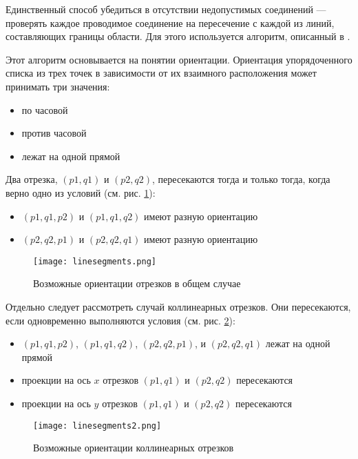 Единственный способ убедиться в отсутствии недопустимых соединений --- проверять каждое проводимое соединение на пересечение с каждой из линий, составляющих границы области. Для этого используется алгоритм, описанный в \cite{noauthor_introduction_2009}.

Этот алгоритм основывается на понятии ориентации. Ориентация упорядоченного списка из трех точек в зависимости от их взаимного расположения может принимать три значения:

\begin{itemize}[noitemsep]
\item по часовой
\item против часовой
\item лежат на одной прямой
\end{itemize}

Два отрезка, $(p1,q1)$ и $(p2,q2)$, пересекаются тогда и только тогда, когда верно одно из условий (см. рис. \ref{fig:segments1}):

\begin{itemize}[noitemsep]
\item $(p1, q1, p2)$ и $(p1, q1, q2)$ имеют разную ориентацию
\item $(p2, q2, p1)$ и $(p2, q2, q1)$ имеют разную ориентацию
\end{itemize}

\begin{figure}[!h]
    \centering
    \texttt{[image: linesegments.png]}
    \caption{Возможные ориентации отрезков в общем случае}
    \label{fig:segments1}
\end{figure}

Отдельно следует рассмотреть случай коллинеарных отрезков. Они пересекаются, если одновременно выполняются условия (см. рис. \ref{fig:segments2}):

\begin{itemize}[noitemsep]
\item $(p1, q1, p2)$, $(p1, q1, q2)$, $(p2, q2, p1)$, и $(p2, q2, q1)$ лежат на одной прямой
\item проекции на ось $x$ отрезков $(p1, q1)$ и $(p2, q2)$ пересекаются
\item проекции на ось $y$ отрезков $(p1, q1)$ и $(p2, q2)$ пересекаются
\end{itemize}

\begin{figure}[!h]
    \centering
    \texttt{[image: linesegments2.png]}
    \caption{Возможные ориентации коллинеарных отрезков}
    \label{fig:segments2}
\end{figure}

